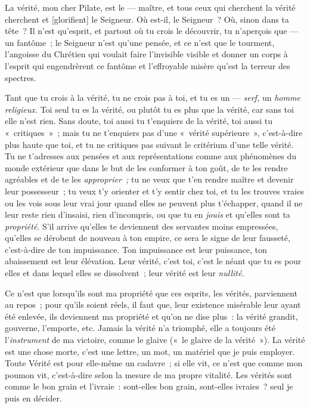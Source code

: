 \documentclass[french,twoside]{book} %
\newcommand\corr[1]{#1}
\begin{document}
La vérité, mon cher Pilate, est le — maître, et tous ceux qui cherchent la vérité cherchent et [{\corr glorifient}] le Seigneur. Où est-il, le Seigneur ? Où, sinon dans ta tête ? Il n’est qu’esprit, et partout où tu crois le découvrir, tu n’aperçois que — un fantôme ; le Seigneur n’est qu’une pensée, et ce n’est que le tourment, l’angoisse du Chrétien qui voulait faire l’invisible visible et donner un corps à l’esprit qui engendrèrent ce fantôme et l’effroyable misère qu’est la terreur des spectres.\par
Tant que tu crois à la vérité, tu ne crois pas à toi,  et tu es un — \emph{serf,} un \emph{homme religieux.} Toi seul tu es la vérité, ou plutôt tu es plus que la vérité, car sans toi elle n’est rien. Sans doute, toi aussi tu t’enquiers de la vérité, toi aussi tu « critiques » ; mais tu ne t’enquiers pas d’une « vérité supérieure », c’est-à-dire plus haute que toi, et tu ne critiques pas suivant le critérium d’une telle vérité. Tu ne t’adresses aux pensées et aux représentations comme aux phénomènes du monde extérieur que dans le but de les conformer à ton goût, de te les rendre agréables et de te les \emph{approprier ;} tu ne veux que t’en rendre maître et devenir leur possesseur ; tu veux t’y orienter et t’y sentir chez toi, et tu les trouves vraies ou les vois sous leur vrai jour quand elles ne peuvent plus t’échapper, quand il ne leur reste rien d’insaisi, rien d’incompris, ou que tu en \emph{jouis} et qu’elles sont ta \emph{propriété}. S’il arrive qu’elles te deviennent des servantes moins empressées, qu’elles se dérobent de nouveau à ton empire, ce sera le signe de leur fausseté, c’est-à-dire de ton impuissance. Ton impuissance est leur puissance, ton abaissement est leur élévation. Leur vérité, c’est toi, c’est le néant que tu es pour elles et dans lequel elles se dissolvent ; leur vérité est leur \emph{nullité.}\par
Ce n’est que lorsqu’ils sont ma propriété que ces esprits, les vérités, parviennent au repos ; pour qu’ils soient réels, il faut que, leur existence misérable leur ayant été enlevée, ils deviennent ma propriété et qu’on ne dise plus : la vérité grandit, gouverne, l’emporte, etc. Jamais la vérité n’a triomphé, elle a toujours été l’\emph{instrument} de ma victoire, comme le glaive (« le glaive de la vérité »). La vérité est une chose morte, c’est une lettre, un mot, un matériel que je puis employer. Toute Vérité est pour elle-même un cadavre ; si elle vit, ce n’est que comme mon poumon vit, c’est-à-dire selon la mesure de ma propre vitalité. Les vérités sont comme le bon grain et l’ivraie : sont-elles bon grain, sont-elles ivraies ? seul je puis en décider.\par
\end{document}
